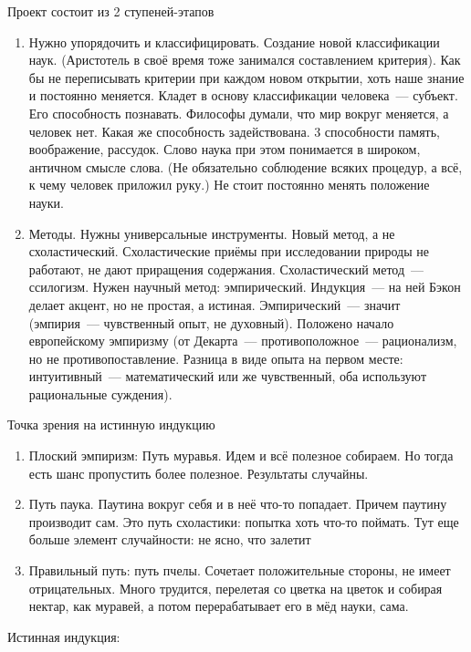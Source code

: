 Проект состоит из 2 ступеней-этапов
\begin{enumerate}
	\item Нужно упорядочить и классифицировать. Создание новой классификации наук. (Аристотель в своё время тоже занимался составлением критерия). Как бы не переписывать критерии при каждом новом открытии, хоть наше знание и постоянно меняется. Кладет в основу классификации человека~--- субъект. Его способность познавать. Философы думали, что мир вокруг меняется, а человек нет. Какая же способность задействована. 3 способности память, воображение, рассудок. Слово наука при этом понимается в широком, античном смысле слова. (Не обязательно соблюдение всяких процедур, а всё, к чему человек приложил руку.) Не стоит постоянно менять положение науки.
	\item Методы. Нужны универсальные инструменты. Новый метод, а не схоластический. Схоластические приёмы при исследовании природы не работают, не дают приращения содержания. Схоластический метод~--- ссилогизм. Нужен научный метод: эмпирический. Индукция~--- на ней Бэкон делает акцент, но не простая, а истиная. Эмпирический~--- значит (эмпирия~--- чувственный опыт, не духовный). Положено начало европейскому эмпиризму (от Декарта~--- противоположное~--- рационализм, но не противопоставление. Разница в виде опыта на первом месте: интуитивный~--- математический или же чувственный, оба используют рациональные суждения).
\end{enumerate}

Точка зрения на истинную индукцию

\begin{enumerate}
	\item Плоский эмпиризм: Путь муравья. Идем и всё полезное собираем. Но тогда есть шанс пропустить более полезное. Результаты случайны.
	\item Путь паука. Паутина вокруг себя и в неё что-то попадает. Причем паутину производит сам. Это путь схоластики: попытка хоть что-то поймать. Тут еще больше элемент случайности: не ясно, что залетит
	\item Правильный путь: путь пчелы. Сочетает положительные стороны, не имеет отрицательных. Много трудится, перелетая со цветка на цветок и собирая нектар, как муравей, а потом перерабатывает его в мёд науки, сама. 
\end{enumerate}
Истинная индукция:

